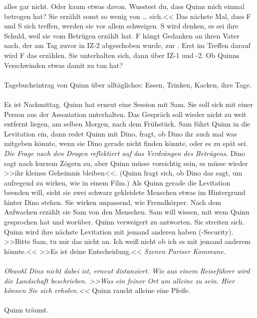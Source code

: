 alles gar nicht. Oder kaum etwas davon. Wusstest du, dass Quinn mich einmal
betrogen hat? Sie erzählt sonst so wenig von \dots{} sich.<< 
Das nächste Mal, dass F und S sich treffen, werden sie vor allem schweigen. 
S wird denken, es sei ihre Schuld, weil sie vom Betrügen erzählt hat. 
F hängt Gedanken an ihren Vater nach, der am Tag zuvor in IZ-2 abgeschoben
wurde, zur . 
Erst im Treffen darauf wird F das erzählen. 
Sie unterhalten sich, dann über IZ-1 und -2. 
Ob Quinns Verschwinden etwas damit zu tun hat?\\\\
%
Tagebucheintrag von Quinn über alltägliches: Essen, Trinken, Kacken, ihre
Tage.\\\\
% 
Es ist Nachmittag.
Quinn hat erneut eine Session mit Sam. 
Sie soll sich mit einer Person aus der Assoziation unterhalten. 
Das Gespräch soll wieder nicht zu weit entfernt liegen, am selben Morgen, nach
dem Frühstück. 
Sam führt Quinn in die Levitation ein, dann redet Quinn mit Dino, fragt, ob
Dino ihr auch mal was mitgeben könnte, wenn sie Dino gerade nicht finden könnte,
oder es zu spät sei.
\emph{Die Frage nach den Drogen reflektiert auf das Verdrängen des Betrügens.}
Dino sagt nach kurzem Zögern zu, aber Quinn müsse vorsichtig sein, es müsse
wieder >>ihr kleines Geheimnis bleiben<<. (Quinn fragt sich, ob Dino das sagt,
um aufregend zu wirken, wie in einem Film.) Als Quinn gerade die Levitation
beenden will, sieht sie zwei schwarz gekleidete Menschen etwas im Hintergrund
hinter Dino stehen. 
Sie wirken unpassend, wie Fremdkörper. 
Nach dem Aufwachen erzählt sie Sam von den Menschen. 
Sam will wissen, mit wem Quinn gesprochen hat und worüber. 
Quinn verweigert zu antworten. 
Sie streiten sich. 
Quinn wird ihre nächste Levitation mit jemand anderen haben
(-Security). >>Bitte Sam, tu mir das nicht an. Ich weiß nicht ob ich
es mit jemand anderem könnte.<< >>Es ist deine Entscheidung.<< 
\emph{Szenen Pariser Kommune.}\\\\
%
\emph{Obwohl Dino nicht dabei ist, erneut distanziert.}
\emph{Wie aus einem Reiseführer wird die Landschaft beschrieben. 
>>Was ein feiner Ort um alleine zu sein. Hier können Sie sich erholen.<<}
Quinn raucht alleine eine Pfeife.\\\\
%
Quinn träumt.\\\\
